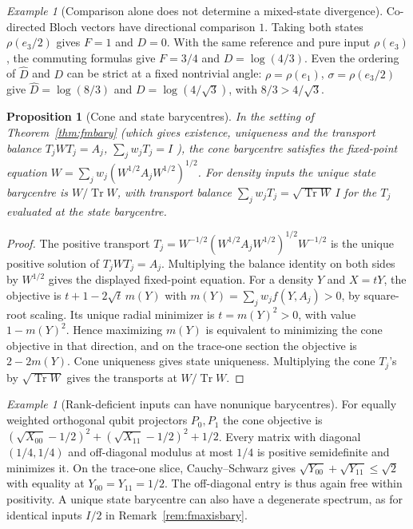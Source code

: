 \documentclass[aps,pra,onecolumn,superscriptaddress,nofootinbib,10pt]{revtex4-2}
\newtheorem{proposition}[theorem]{Proposition}
\theoremstyle{definition}
\theoremstyle{remark}
\newtheorem{example}[theorem]{Example}
\newcommand{\tr}{\operatorname{Tr}}
\begin{document}
\begin{example}[Comparison alone does not determine a mixed-state divergence]
\label{ob:divergencecounter}
Co-directed Bloch vectors have directional comparison \(1\).
Taking both states \(\rho(e_3/2)\) gives \(F=1\) and \(D=0\). With
the same reference and pure input \(\rho(e_3)\), the commuting
formulas give \(F=3/4\) and \(D=\log(4/3)\). Even the ordering of
\(\widehat D\) and \(D\) can be strict at a fixed nontrivial angle:
\(\rho=\rho(e_1)\), \(\sigma=\rho(e_3/2)\) give
\(\widehat D=\log(8/3)\) and \(D=\log(4/\sqrt3)\), with
\(8/3>4/\sqrt3\).
\end{example}

\begin{proposition}[Cone and state barycentres]\label{ob:barycentres}
In the setting of Theorem~\ref{thm:fmbary} (which gives existence, uniqueness and the transport balance
\(T_jWT_j=A_j\), \(\sum_jw_jT_j=I\) \cite[Theorem~8 and Eq.~(57)]{n2-bjl}), the cone barycentre satisfies the fixed-point
equation \(W=\sum_jw_j(W^{1/2}A_jW^{1/2})^{1/2}\).  For density inputs the unique state barycentre is \(W/\tr W\), with
transport balance \(\sum_jw_j T_j=\sqrt{\tr W}\,I\) for the \(T_j\) evaluated at the state barycentre.
\end{proposition}
\begin{proof}
The positive transport \(T_j=W^{-1/2}(W^{1/2}A_jW^{1/2})^{1/2}W^{-1/2}\)
is the unique positive solution of \(T_jWT_j=A_j\). Multiplying the
balance identity on both sides by \(W^{1/2}\) gives the displayed
fixed-point equation. For a density \(Y\) and \(X=tY\),
the objective is \(t+1-2\sqrt t\,m(Y)\) with
\(m(Y)=\sum_j w_j f(Y,A_j)>0\), by square-root scaling.
Its unique radial minimizer is \(t=m(Y)^2>0\), with value
\(1-m(Y)^2\). Hence maximizing \(m(Y)\) is equivalent to minimizing
the cone objective in that direction, and on the trace-one section
the objective is \(2-2m(Y)\). Cone uniqueness gives state uniqueness.
Multiplying the cone \(T_j\)'s by \(\sqrt{\tr W}\) gives the transports
at \(W/\tr W\).
\end{proof}

\begin{example}[Rank-deficient inputs can have nonunique barycentres]
\label{ob:singularbarycentre}
For equally weighted orthogonal qubit projectors \(P_0,P_1\) the
cone objective is
\((\sqrt{X_{00}}-1/2)^2+(\sqrt{X_{11}}-1/2)^2+1/2\).
Every matrix with diagonal \((1/4,1/4)\) and off-diagonal modulus at
most \(1/4\) is positive semidefinite and minimizes it. On the trace-one
slice, Cauchy--Schwarz gives \(\sqrt{Y_{00}}+\sqrt{Y_{11}}\le\sqrt2\)
with equality at \(Y_{00}=Y_{11}=1/2\). The off-diagonal entry is thus
again free within positivity. A unique state barycentre can also have
a degenerate spectrum, as for identical inputs \(I/2\) in
Remark~\ref{rem:fmaxisbary}.
\end{example}
\end{document}
